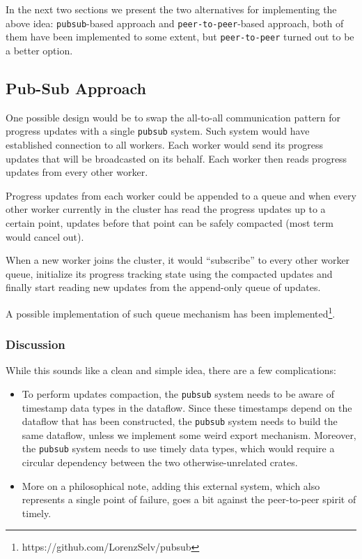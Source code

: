 \documentclass[12pt]{extarticle}
\begin{document}
In the next two sections we present the two alternatives for implementing the above idea:
\verb|pubsub|-based approach and \verb|peer-to-peer|-based approach, both of them
have been implemented to some extent, but \verb|peer-to-peer| turned out to be a better option.

\subsection{Pub-Sub Approach}

One possible design would be to swap the all-to-all communication pattern for progress updates
with a single \verb|pubsub| system. Such system would have established connection to all workers.
Each worker would send its progress updates that will be broadcasted on its behalf. Each worker
then reads progress updates from every other worker.

Progress updates from each worker could be appended to a queue and when every other worker currently
in the cluster has read the progress updates up to a certain point, updates before that point
can be safely compacted (most term would cancel out).

When a new worker joins the cluster, it would ``subscribe'' to every other worker queue,
initialize its progress tracking state using the compacted updates and finally start reading
new updates from the append-only queue of updates.

A possible implementation of such queue mechanism has been implemented\footnote{https://github.com/LorenzSelv/pubsub}.

\subsubsection{Discussion}

While this sounds like a clean and simple idea, there are a few complications:
\begin{itemize}
    \item To perform updates compaction, the \verb|pubsub| system needs to be aware of timestamp
        data types in the dataflow. Since these timestamps depend on the dataflow that has been constructed,
        the \verb|pubsub| system needs to build the same dataflow, unless we implement some weird export
        mechanism. Moreover, the \verb|pubsub| system needs to use timely data types, which would require
        a circular dependency between the two otherwise-unrelated crates.

    \item More on a philosophical note, adding this external system, which also represents a single point of
        failure, goes a bit against the peer-to-peer spirit of timely.

\end{itemize}
\end{document}
